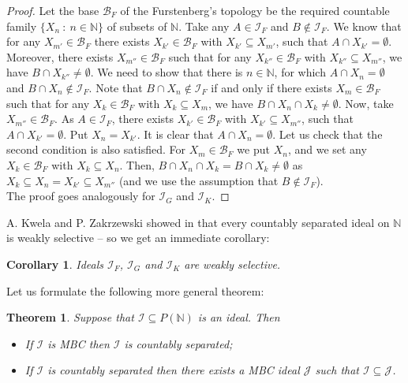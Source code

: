 \documentclass{amsart}
\newtheorem{thm}{Theorem}
\newtheorem{cor}{Corollary}
\theoremstyle{definition}
\newtheorem{remark}{Remark}
\theoremstyle{definition}
\newcommand{\N}{{\mathbb N}}
\newcommand{\I}{\mathcal I}
\newcommand{\J}{\mathcal J}
\begin{document}
\begin{proof}
Let the base $\mathcal{B}_F$ of the Furstenberg's topology be the required countable family $\{X_n\ :\ n\in\N\}$ of subsets of $\N$. Take any $A\in \I_F$ and $B\notin \I_F$. We know that for any $X_{m'} \in \mathcal{B}_F$ there exists $X_{k'} \in \mathcal{B}_F$ with $X_{k'} \subseteq X_{m'}$, such that $A\cap X_{k'} = \emptyset$. Moreover, there exists $X_{m''} \in \mathcal{B}_F$ such that for any $X_{k''} \in \mathcal{B}_F$ with $X_{k''} \subseteq X_{m''}$, we have $B\cap X_{k''} \neq \emptyset$. 
We need to show that there is $n\in\N$, for which $A\cap X_n=\emptyset$ and $B\cap X_n\notin \I_F$. Note that $B\cap X_n\notin \I_F$ if and only if there exists $X_{m} \in \mathcal{B}_F$ such that for any $X_{k} \in \mathcal{B}_F$ with $X_{k} \subseteq X_{m}$, we have $B\cap X_n\cap X_{k} \neq \emptyset$. 
Now, take $X_{m''} \in \mathcal{B}_F$. As $A\in\I_F$, there exists $X_{k'} \in \mathcal{B}_F$ with $X_{k'} \subseteq X_{m''}$, such that $A\cap X_{k'} = \emptyset$. Put $X_n = X_{k'}$. It is clear that $A\cap X_n = \emptyset$. Let us check that the second condition is also satisfied. For $X_{m} \in \mathcal{B}_F$ we put $X_n$, and we set any $X_{k} \in \mathcal{B}_F$ with $X_{k} \subseteq X_n$. Then, $B\cap X_n\cap X_{k} = B\cap X_{k}\neq \emptyset$ as $X_k \subseteq X_n = X_{k'} \subseteq X_{m''}$ (and we use the assumption that $B\notin \I_F$).\\
The proof goes analogously for $\I_G$ and $\I_K$.
\end{proof}

A. Kwela and P. Zakrzewski showed in \cite[Proposition 4.3]{KwelaZak} that every countably separated ideal on $\N$ is weakly selective -- so we get an immediate corollary:

\begin{cor}
Ideals $\I_F$, $\I_G$ and $\I_K$ are weakly selective.
\end{cor}

Let us formulate the following more general theorem:

\begin{thm}
Suppose that $\I \subseteq P(\N)$ is an ideal. Then
\begin{itemize}
\item If $\I$ is \emph{MBC} then $\I$ is 
countably separated;
\item If $\I$ is countably separated then there 
exists a \emph{MBC} ideal $\J$ such that $\I \subseteq \J$.
\end{itemize}
\end{thm}
\end{document}
